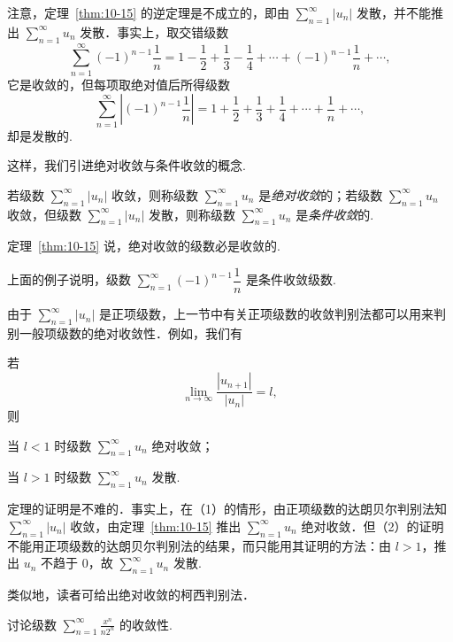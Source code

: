 注意，定理~\ref{thm:10-15} 的逆定理是不成立的，即由 $\sum_{n=1}^{\infty}|u_n|$ 发散，并不能推出 $\sum_{n=1}^{\infty}u_n$ 发散．事实上，取交错级数
\[
\sum_{n=1}^{\infty}(-1)^{n-1}\frac{1}{n}=1-\frac{1}{2}+\frac{1}{3}-\frac{1}{4}+\cdots+(-1)^{n-1}\frac{1}{n}+\cdots,
\]
它是收敛的，但每项取绝对值后所得级数
\[
\sum_{n=1}^{\infty}\left|(-1)^{n-1}\frac{1}{n}\right|=1+\frac{1}{2}+\frac{1}{3}+\frac{1}{4}+\cdots+\frac{1}{n}+\cdots,
\]
却是发散的.

这样，我们引进绝对收敛与条件收敛的概念.

\begin{definition}\label{def:10-3}
若级数 $\sum_{n=1}^{\infty}|u_{n}|$ 收敛，则称级数 $\sum_{n=1}^{\infty}u_{n}$ 是\emph{绝对收敛}的；若级数 $\sum_{n=1}^{\infty}u_{n}$ 收敛，但级数 $\sum_{n=1}^{\infty}|u_{n}|$ 发散，则称级数 $\sum_{n=1}^{\infty}u_{n}$ 是\emph{条件收敛}的.
\end{definition}

定理~\ref{thm:10-15} 说，绝对收敛的级数必是收敛的.

上面的例子说明，级数 $\sum_{n=1}^{\infty}(-1)^{n-1}\dfrac{1}{n}$ 是条件收敛级数.

由于 $\sum_{n=1}^{\infty}|u_{n}|$ 是正项级数，上一节中有关正项级数的收敛判别法都可以用来判别一般项级数的绝对收敛性．例如，我们有

\begin{theorem}[达朗贝尔判别法]\label{thm:10-16}
若
\[
\lim_{n\to\infty}\frac{|u_{n+1}|}{|u_{n}|}=l,
\]
则
\begin{ziti}
\item 当 $l<1$ 时级数 $\sum_{n=1}^{\infty}u_{n}$ 绝对收敛；
\item 当 $l>1$ 时级数 $\sum_{n=1}^{\infty}u_{n}$ 发散.
\end{ziti}
\end{theorem}

定理的证明是不难的．事实上，在（1）的情形，由正项级数的达朗贝尔判别法知 $\sum_{n=1}^{\infty}|u_{n}|$ 收敛，由定理~\ref{thm:10-15} 推出 $\sum_{n=1}^{\infty}u_{n}$ 绝对收敛．但（2）的证明不能用正项级数的达朗贝尔判别法的结果，而只能用其证明的方法：由 $l>1$，推出 $u_{n}$ 不趋于 $0$，故 $\sum_{n=1}^{\infty}u_{n}$ 发散.

类似地，读者可给出绝对收敛的柯西判别法．

\begin{example}\label{ex:10-4-2-3}
讨论级数 $\displaystyle\sum_{n=1}^{\infty}\frac{x^{n}}{n2^{n}}$ 的收敛性.
\end{example}

